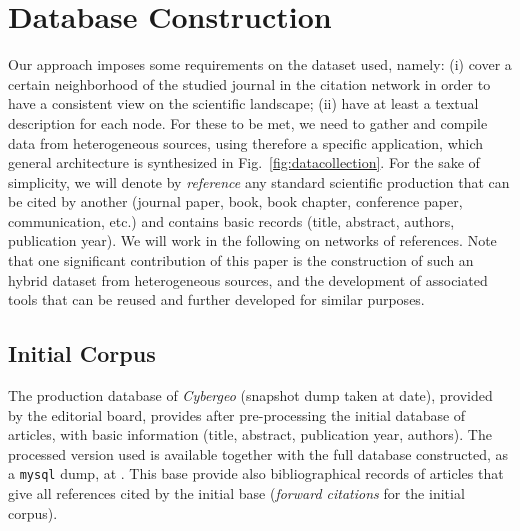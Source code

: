 



\section*{Database Construction}
\label{sec:data}



Our approach imposes some requirements on the dataset used, namely: (i) cover a certain neighborhood of the studied journal in the citation network in order to have a consistent view on the scientific landscape; (ii) have at least a textual description for each node. For these to be met, we need to gather and compile data from heterogeneous sources, using therefore a specific application, which general architecture is synthesized in Fig.~\ref{fig:datacollection}. For the sake of simplicity, we will denote by \emph{reference} any standard scientific production that can be cited by another (journal paper, book, book chapter, conference paper, communication, etc.) and contains basic records (title, abstract, authors, publication year). We will work in the following on networks of references. Note that one significant contribution of this paper is the construction of such an hybrid dataset from heterogeneous sources, and the development of associated tools that can be reused and further developed for similar purposes.



\subsection*{Initial Corpus}

The production database of \textit{Cybergeo} (snapshot dump taken at date), provided by the editorial board, provides after pre-processing the initial database of articles, with basic information (title, abstract, publication year, authors). The processed version used is available together with the full database constructed, as a \texttt{mysql} dump, at \texttt{}. This base provide also bibliographical records of articles that give all references cited by the initial base (\emph{forward citations} for the initial corpus).



